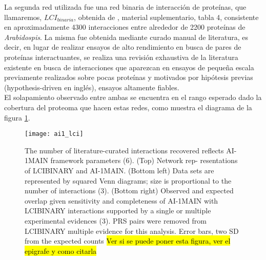 La segunda red utilizada fue una red binaria de interacción de proteínas, que llamaremos, $LCI_{binaria}$, obtenida de \cite{Hahn2013}, material suplementario, tabla 4, consistente en aproximadamente 4300 interacciones entre alrededor de 2200 proteínas de \textit{Arabidospis}. La misma fue obtenida mediante curado manual de literatura, es decir, en lugar de realizar ensayos de alto rendimiento en busca de pares de proteínas interactuantes, se realiza una revisión exhaustiva de la literatura existente en busca de interacciones que aparezcan en ensayos de pequeña escala previamente realizados sobre pocas proteínas y motivados por hipótesis previas (hypothesis-driven en inglés), ensayos altamente fiables.\cite{Cusick2009}\\
El solapamiento observado entre ambas se encuentra en el rango esperado dado la cobertura del proteoma que hacen estas redes, como muestra el diagrama de la figura \ref{fig:ai1_lci}.
\begin{figure}[h]
    \centering
    \texttt{[image: ai1\_lci]}
    \caption{The number of literature-curated interactions recovered reflects AI-1MAIN framework parameters (6). (Top) Network rep- resentations of LCIBINARY and AI-1MAIN. (Bottom left) Data sets are represented by squared Venn diagrams; size is proportional to the number of interactions (3). (Bottom right) Observed and expected overlap given sensitivity and completeness of AI-1MAIN with LCIBINARY interactions supported by a single or multiple experimental evidences (3). PRS pairs were removed from LCIBINARY multiple evidence for this analysis. Error bars, two SD from the expected counts \hl{Ver si se puede poner esta figura, ver el epigrafe y como citarla}}
    \label{fig:ai1_lci}
\end{figure}
